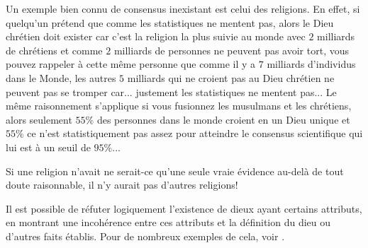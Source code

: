 	Un exemple bien connu de consensus inexistant est celui des religions. En effet, si quelqu'un pr\'etend que comme les statistiques ne mentent pas, alors le Dieu chr\'etien doit exister car c'est la religion la plus suivie au monde avec $2$ milliards de chr\'etiens et comme $2$ milliards de personnes ne peuvent pas avoir tort, vous pouvez rappeler à cette même personne que comme il y a $7$ milliards d'individus dans le Monde, les autres $5$ milliards qui ne croient pas au Dieu chr\'etien ne peuvent pas se tromper car... justement les statistiques ne mentent pas... Le même raisonnement s'applique si vous fusionnez les musulmans et les chr\'etiens, alors seulement $55\%$ des personnes dans le monde croient en un Dieu unique et $55\% $ ce n'est statistiquement pas assez pour atteindre le consensus scientifique qui lui est à un seuil de $95\%$...
	
	\begin{fquote}Si une religion n’avait ne serait-ce qu’une seule vraie évidence au-delà de tout doute raisonnable, il n’y aurait pas d’autres religions!
 	\end{fquote}
	
	\begin{tcolorbox}[title=Remarque,colframe=black,arc=10pt]
	Il est possible de réfuter logiquement l'existence de dieux ayant certains attributs, en montrant une incohérence entre ces attributs et la définition du dieu ou d'autres faits établis. Pour de nombreux exemples de cela, voir  \cite{martin2003impossibility}.
	\end{tcolorbox}
	
